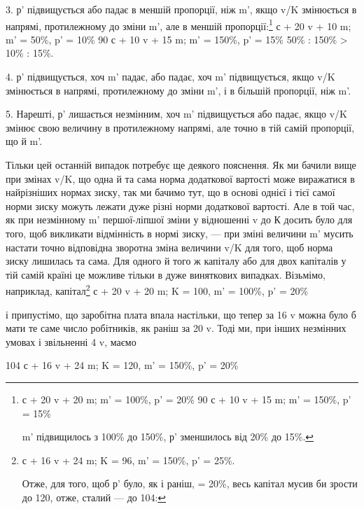 3. р' підвищується або падає в меншій пропорції, ніж m',
якщо v/K змінюється в напрямі, протилежному до зміни m', але
в меншій пропорції:\footnote{
с + 20 v + 20 m; m' = 100\%, p' = 20\%
90 с + 10 v + 15 m; m' = 150\%, p' = 15\%

m' підвищилось з 100\% до 150\%, р' зменшилось від 20\% до 15\%.
} с + 20 v + 10 m; m' = 50\%, p' = 10\%
90 с + 10 v + 15 m; m' = 150\%, p' = 15\%
50\% : 150\% > 10\% : 15\%.

4. р' підвищується, хоч m' падає, або падає, хоч m' підвищується,
якщо v/K змінюється в напрямі, протилежному до зміни
m', і в більшій пропорції, ніж m'.

5. Нарешті, р' лишається незмінним, хоч m' підвищується або
падає, якщо v/K змінює свою величину в протилежному напрямі,
але точно в тій самій пропорції, що й m'.

Тільки цей останній випадок потребує ще деякого пояснення.
Як ми бачили вище при змінах v/K, що одна й та сама норма
додаткової вартості може виражатися в найрізніших нормах
зиску, так ми бачимо тут, що в основі однієї і тієї самої норми
зиску можуть лежати дуже різні норми додаткової вартості.
Але в той час, як при незмінному m' першої-ліпшої зміни у відношенні
v до К досить було для того, щоб викликати відмінність
в нормі зиску, — при зміні величини m' мусить настати точно
відповідна зворотна зміна величини v/K для того, щоб норма
зиску лишилась та сама. Для одного й того ж капіталу або для
двох капіталів у тій самій країні це можливе тільки в дуже
виняткових випадках. Візьмімо, наприклад, капітал\footnote{
с + 16 v + 24 m; K = 96, m' = 150\%, p' = 25\%.

Отже, для того, щоб р' було, як і раніш, = 20\%, весь капітал
мусив би зрости до 120, отже, сталий — до 104:
} с + 20 v + 20 m; K = 100, m' = 100\%, p' = 20\%

і припустімо, що заробітна плата впала настільки, що тепер за
16 v можна було б мати те саме число робітників, як раніш за
20 v. Тоді ми, при інших незмінних умовах і звільненні 4 v,
маємо

104 с + 16 v + 24 m; K = 120, m' = 150\%, p' = 20\%
